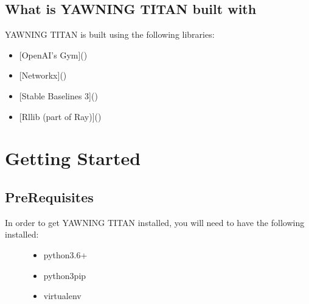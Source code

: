 \documentclass[letterpaper,10pt,english]{sphinxmanual}
\begin{document}
\section{What is YAWNING TITAN built with}
\label{\detokenize{source/intro:what-is-yawning-titan-built-with}}
\sphinxAtStartPar
YAWNING TITAN is built using the following libraries:
\begin{itemize}
\item {}
\sphinxAtStartPar
{[}OpenAI’s Gym{]}()

\item {}
\sphinxAtStartPar
{[}Networkx{]}()

\item {}
\sphinxAtStartPar
{[}Stable Baselines 3{]}()

\item {}
\sphinxAtStartPar
{[}Rllib (part of Ray){]}()

\end{itemize}


\chapter{Getting Started}
\label{\detokenize{source/getting_started:getting-started}}\label{\detokenize{source/getting_started::doc}}

\section{Pre\sphinxhyphen{}Requisites}
\label{\detokenize{source/getting_started:pre-requisites}}\begin{description}
\item[{In order to get YAWNING TITAN installed, you will need to have the following installed:}] \leavevmode\begin{itemize}
\item {}
\sphinxAtStartPar
python3.6+

\item {}
\sphinxAtStartPar
python3\sphinxhyphen{}pip

\item {}
\sphinxAtStartPar
virtualenv

\end{itemize}

\end{description}
\end{document}
